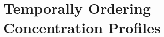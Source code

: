 \section[Temporally Ordering Concentration Profiles]{Temporally Ordering Concentration Profiles}

%
%
%
%
%
%
%
%
%   
%      
